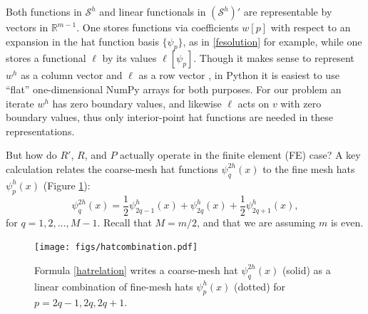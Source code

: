 \documentclass[letterpaper,final,12pt,reqno]{amsart}
\newcommand{\RR}{\mathbb{R}}
\begin{document}
Both functions in $\mathcal{S}^h$ and linear functionals in $(\mathcal{S}^h)'$ are representable by vectors in $\RR^{m-1}$.  One stores functions via coefficients $w[p]$ with respect to an expansion in the hat function basis $\{\psi_p\}$, as in \eqref{fesolution} for example, while one stores a functional $\ell$ by its values $\ell[\psi_p]$.  Though it makes sense to represent $w^h$ as a column vector and $\ell$ as a row vector \cite{TrefethenBau1997}, in Python it is easiest to use ``flat'' one-dimensional NumPy arrays for both purposes.  For our problem an iterate $w^h$ has zero boundary values, and likewise $\ell$ acts on $v$ with zero boundary values, thus only interior-point hat functions are needed in these representations.

But how do $R'$, $R$, and $P$ actually operate in the finite element (FE) case?  A key calculation relates the coarse-mesh hat functions $\psi_q^{2h}(x)$ to the fine mesh hats $\psi_p^h(x)$ (Figure \ref{fig:hatcombination}):
\begin{equation}
  \psi_q^{2h}(x) = \frac{1}{2} \psi_{2q-1}^h(x) + \psi_{2q}^h(x) + \frac{1}{2} \psi_{2q+1}^h(x), \label{hatrelation}
\end{equation}
for $q=1,2,\dots,M-1$.  Recall that $M=m/2$, and that we are assuming $m$ is even.

\begin{figure}
\texttt{[image: figs/hatcombination.pdf]}
\caption{Formula \eqref{hatrelation} writes a coarse-mesh hat $\psi_q^{2h}(x)$ (solid) as a linear combination of fine-mesh hats $\psi_p^h(x)$ (dotted) for $p=2q-1,2q,2q+1$.}
\label{fig:hatcombination}
\end{figure}
\end{document}
